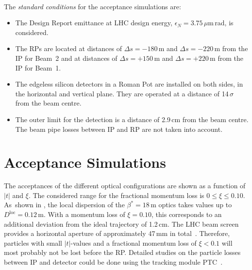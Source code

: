 \paragraph{}
The \textit{standard conditions} for the acceptance simulations are: 
\begin{itemize}
\item The Design Report emittance at LHC design energy, $\epsilon_N = 3.75 \,\mu$m$\,$rad, is considered.
\item The RPs are located at distances of $\Delta s=-180\,$m and $\Delta s = -220\,$m from the IP for \mbox{Beam 2} and at distances of $\Delta s = +150\,$m and $\Delta s = +220\,$m from the IP for \mbox{Beam 1}.
\item The edgeless silicon detectors in a Roman Pot are installed on both sides, in the horizontal and vertical plane. They are operated at a distance of 14$\,\sigma$ from the beam centre.
\item The outer limit for the detection is a distance of 2.9$\,$cm from the beam centre. The beam pipe losses between IP and RP are not taken into account. 
\end{itemize}

\section{Acceptance Simulations}
The acceptances of the different optical configurations are shown as a function of $|t|$ and $\xi$. The considered range for the fractional momentum loss is \mbox{$0\leq \xi \leq 0.10$}. \mbox{As shown} in , the local dispersion of the $\beta^*=18\,$m optics takes values up to \mbox{$D^{\text{loc}}=0.12\,$m}. With a momentum loss of $\xi=0.10$, this corresponds to an additional deviation from the ideal trajectory of 1.2$\,$cm. The LHC beam screen provides a horizontal aperture of approximately 47$\,$mm in total~\cite{anashin2004vacuum}. Therefore, particles with small $|t|$-values and a fractional momentum loss of $\xi < 0.1$ will most probably not be lost before the RP. Detailed studies on the particle losses between IP and detector could be done using the tracking module PTC~\cite{schmidt2005mad}. 
